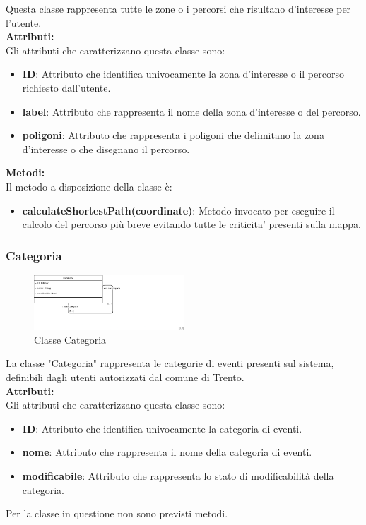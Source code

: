 Questa classe rappresenta tutte le zone o i percorsi che risultano d'interesse per l'utente.\\

\textbf{Attributi:}\\
Gli attributi che caratterizzano questa classe sono:
\begin{itemize}
    \item \textbf{ID}: Attributo che identifica univocamente la zona d'interesse o il percorso richiesto dall'utente.
    \item \textbf{label}: Attributo che rappresenta il nome della zona d'interesse o del percorso.
    \item \textbf{poligoni}: Attributo che rappresenta i poligoni che delimitano la zona d'interesse o che disegnano il percorso.\\
\end{itemize}

\textbf{Metodi:}\\
Il metodo a disposizione della classe è:
\begin{itemize}
    \item \textbf{calculateShortestPath(coordinate)}: Metodo invocato per eseguire il calcolo del percorso più breve evitando tutte le criticita' presenti sulla mappa.
\end{itemize}

\clearpage

\subsubsection{Categoria}

\begin{figure}[htbp]
    \centering
    \includegraphics[width=0.5\textwidth]{Images/Categoria-Class.png}
    \caption{Classe Categoria}
    \label{fig:categoria}
\end{figure}

La classe "Categoria" rappresenta le categorie di eventi presenti sul sistema, definibili dagli utenti autorizzati dal comune di Trento.\\

\textbf{Attributi:}\\
Gli attributi che caratterizzano questa classe sono:
\begin{itemize}
    \item \textbf{ID}: Attributo che identifica univocamente la categoria di eventi.
    \item \textbf{nome}: Attributo che rappresenta il nome della categoria di eventi.
    \item \textbf{modificabile}: Attributo che rappresenta lo stato di modificabilità della categoria.\\
\end{itemize}
Per la classe in questione non sono previsti metodi.

